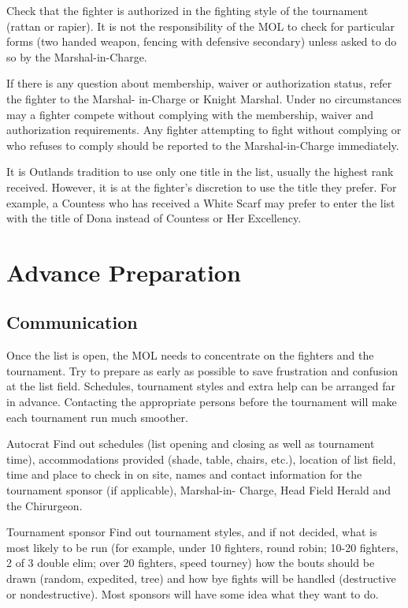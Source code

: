 \documentclass{article}
\begin{document}
Check that the fighter is authorized in the fighting style of the tournament (rattan or rapier). It is not the
responsibility of the MOL to check for particular forms (two handed weapon, fencing with defensive
secondary) unless asked to do so by the Marshal-in-Charge.

If there is any question about membership, waiver or authorization status, refer the fighter to the Marshal-
in-Charge or Knight Marshal. Under no circumstances may a fighter compete without complying with the
membership, waiver and authorization requirements. Any fighter attempting to fight without complying
or who refuses to comply should be reported to the Marshal-in-Charge immediately.

It is Outlands tradition to use only one title in the list, usually the highest rank received. However, it is at
the fighter’s discretion to use the title they prefer. For example, a Countess who has received a White
Scarf may prefer to enter the list with the title of Dona instead of Countess or Her Excellency.

\section{Advance Preparation}
\subsection{Communication}

Once the list is open, the MOL needs to concentrate on the fighters and the tournament. Try to prepare as
early as possible to save frustration and confusion at the list field. Schedules, tournament styles and extra
help can be arranged far in advance. Contacting the appropriate persons before the tournament will make
each tournament run much smoother.

Autocrat Find out schedules (list opening and closing as well as tournament
time), accommodations provided (shade, table, chairs, etc.), location
of list field, time and place to check in on site, names and contact
information for the tournament sponsor (if applicable), Marshal-in-
Charge, Head Field Herald and the Chirurgeon.

Tournament sponsor Find out tournament styles, and if not decided, what is most likely to
be run (for example, under 10 fighters, round robin; 10-20 fighters, 2
of 3 double elim; over 20 fighters, speed tourney) how the bouts
should be drawn (random, expedited, tree) and how bye fights will
be handled (destructive or nondestructive). Most sponsors will have
some idea what they want to do.
\end{document}
